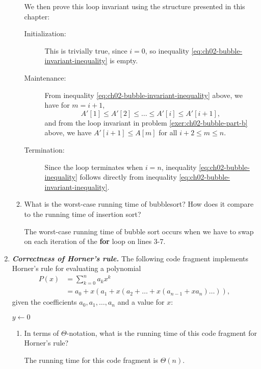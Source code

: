 \documentclass[Chapter02]{subfiles}
\begin{document}
\begin{enumerate}[leftmargin=\labelsep,label={\textbf{\thesection-\arabic*}}]
\begin{enumerate}[resume]
\begin{answer}
				We then prove this loop invariant using the structure presented in this chapter:
				\begin{description}
					\item[Initialization:] This is trivially true, since $i = 0$, so inequality \eqref{eq:ch02-bubble-invariant-inequality} is empty.

					\item[Maintenance:] From inequality \eqref{eq:ch02-bubble-invariant-inequality} above, we have for $m = i + 1$,
					\[
						A'[1] \leq A'[2] \leq \dots \leq A'[i] \leq A'[i + 1],
					\]
					and from the loop invariant in problem \ref{exer:ch02-bubble-part-b} above, we have $A'[i + 1] \leq A[m]$ for all $i + 2 \leq m \leq n$.

					\item[Termination:] Since the loop terminates when $i = n$, inequality \eqref{eq:ch02-bubble-inequality} follows directly from inequality \eqref{eq:ch02-bubble-invariant-inequality}.
				\end{description}
			\end{answer}
			
			\item What is the worst-case running time of bubblesort? How does it compare to the running time of insertion sort?
			\begin{answer}
				The worst-case running time of bubble sort occurs when we have to swap on each iteration of the \textbf{for} loop on lines 3-7.
			\end{answer}
			
		\end{enumerate}
		
		\item \textbf{\textit{Correctness of Horner's rule.}} The following code fragment implements Horner's rule for evaluating a polynomial
		\begin{align*}
			P(x) &= \sum_{k = 0}^n a_kx^k\\
				&= a_0 + x(a_1 + x(a_2 + \dots + x(a_{n - 1} + xa_n) \dots)),
		\end{align*}
		given the coefficients $a_0, a_1, \dots, a_n$ and a value for $x$:

		\begin{algorithm}[H]
			$y \leftarrow 0$\;
		\end{algorithm}
		\begin{enumerate}
			\item In terms of $\Theta$-notation, what is the running time of this code fragment for Horner's rule?
			\begin{answer}
				The running time for this code fragment is $\Theta(n)$.
			\end{answer}


\end{enumerate}
\end{enumerate}
\end{document}
